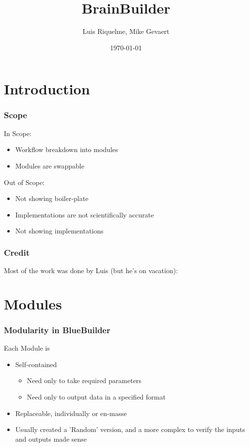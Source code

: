 \documentclass{beamer}
\title{BrainBuilder}
\author{Luis Riquelme, Mike Gevaert}
\institute{Human Brain Project}
\date{\today}
\begin{document}
\begin{frame}
  \titlepage
\end{frame}

\section{Introduction}
\begin{frame}
  \frametitle{Scope}
  In Scope:
  \begin{itemize}
     \item Workflow breakdown into modules
     \item Modules are swappable
  \end{itemize}

  Out of Scope:
  \begin{itemize}
     \item Not showing boiler-plate
     \item Implementations are not scientifically accurate
     \item Not showing implementations
  \end{itemize}
\end{frame}

\begin{frame}
  \frametitle{Credit}
  Most of the work was done by Luis (but he's on vacation):
\end{frame}

\section{Modules}

\begin{frame}
  \frametitle{Modularity in BlueBuilder}
  Each Module is
  \begin{itemize}
    \item Self-contained
    \begin{itemize}
       \item Need only to take required parameters
       \item Need only to output data in a specified format
    \end{itemize}
    \item Replaceable, individually or en-masse
    \item Usually created a 'Random' version, and a more complex to verify the inputs and outputs made sense
  \end{itemize}
\end{frame}
\end{document}
